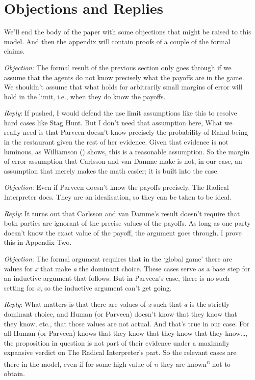 \documentclass[
  10pt,
  letterpaper,
  DIV=11,
  numbers=noendperiod,
  twoside]{scrartcl}
\begin{document}
\section{Objections and Replies}\label{objectionsandreplies}

We'll end the body of the paper with some objections that might be
raised to this model. And then the appendix will contain proofs of a
couple of the formal claims.

\emph{Objection}: The formal result of the previous section only goes
through if we assume that the agents do not know precisely what the
payoffs are in the game. We shouldn't assume that what holds for
arbitrarily small margins of error will hold in the limit, i.e., when
they do know the payoffs.

\emph{Reply}: If pushed, I would defend the use limit assumptions like
this to resolve hard cases like Stag Hunt. But I don't need that
assumption here, What we really need is that Parveen doesn't know
precisely the probability of Rahul being in the restaurant given the
rest of her evidence. Given that evidence is not luminous, as Williamson
() shows, this is a reasonable
assumption. So the margin of error assumption that Carlsson and van
Damme make is not, in our case, an assumption that merely makes the math
easier; it is built into the case.

\emph{Objection}: Even if Parveen doesn't know the payoffs precisely,
The Radical Interpreter does. They are an idealisation, so they can be
taken to be ideal.

\emph{Reply}: It turns out that Carlsson and van Damme's result doesn't
require that both parties are ignorant of the precise values of the
payoffs. As long as one party doesn't know the exact value of the
payoff, the argument goes through. I prove this in Appendix Two.

\emph{Objection}: The formal argument requires that in the `global game'
there are values for \emph{x} that make \emph{a} the dominant choice.
These cases serve as a base step for an inductive argument that follows.
But in Parveen's case, there is no such setting for \emph{x}, so the
inductive argument can't get going.

\emph{Reply}: What matters is that there are values of \emph{x} such
that \emph{a} is the strictly dominant choice, and Human (or Parveen)
doesn't know that they know that they know, etc., that those values are
not actual. And that's true in our case. For all Human (or Parveen)
knows that they know that they know that they know\ldots, the
proposition in question is not part of their evidence under a maximally
expansive verdict on The Radical Interpreter's part. So the relevant
cases are there in the model, even if for some high value of \emph{n}
they are known\textsuperscript{\emph{n}} not to obtain.
\end{document}
